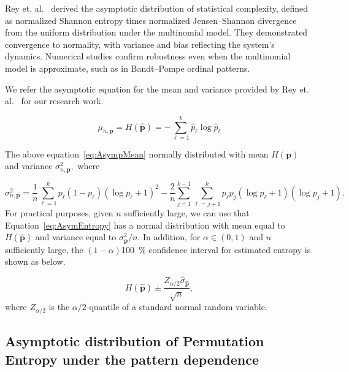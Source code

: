 Rey et. al.~\cite{Rey2025} derived the asymptotic distribution of statistical complexity, defined as normalized Shannon entropy times normalized Jensen–Shannon divergence from the uniform distribution under the multinomial model. They demonstrated convergence to normality, with variance and bias reflecting the system’s dynamics. Numerical studies confirm robustness even when the multinomial model is approximate, such as in Bandt–Pompe ordinal patterns. 

We refer the asymptotic equation for the mean and variance provided by Rey et. al.~\cite{Rey2025} for our research work.

\begin{equation}
	\mu_{n,\mathbf{p}}	= H(\widehat{\mathbf{p}})
	= -\sum_{\ell=1}^k \widehat{p}_\ell \log \widehat{p}_\ell 
	\label{eq:AsympMean}
\end{equation}  

The above equation~\ref{eq:AsympMean} normally distributed with mean $H(\mathbf{p})$ and variance $\sigma^2_{n,\mathbf{p}},$ where

\begin{equation}
	\sigma^2_{n,\mathbf{p}}=\dfrac{1}{n}\sum_{\ell=1}^{k}p_\ell(1-p_\ell)(\log p_\ell+1)^2-\dfrac{2}{n}\sum_{j=1}^{k-1}\sum_{\ell=j+1}^{k}p_\ell p_j(\log p_\ell+1)(\log p_j+1).
\end{equation}
For practical purposes, given $n$ sufficiently large, we can use that Equation~\ref{eq:AsymEntropy} has a normal distribution with mean equal to $H(\widehat{\mathbf{p}})$ and variance equal to $\sigma^2_{\mathbf{p}}/n.$ In addition, for $\alpha \in (0,1)$ and $n$ sufficiently large, the $(1-\alpha)$\SI {100}{\percent} confidence interval for estimated entropy is shown as below.

\begin{equation}
	H(\widehat{\mathbf{p}})\pm \dfrac{Z_{\alpha/2}\widehat{\sigma}_{\widehat{\mathbf{p}}}}{\sqrt{n}},
	\label{eq:ConfidenceInterval}
\end{equation}
where $Z_{\alpha/2}$ is the $\alpha/2$-quantile of a standard normal random variable.


\subsection{Asymptotic distribution of Permutation Entropy under the pattern dependence}\label{Subsec:PatternDependence}

